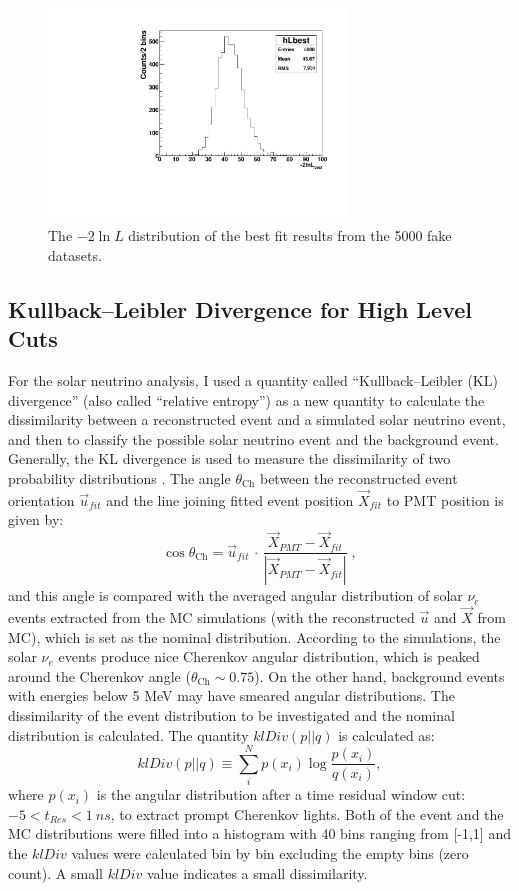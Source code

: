 \begin{figure}[!htb]
	\centering
	\includegraphics[width=8cm]{ensemble_lnLbest.pdf}
	\caption{The $-2\ln L$ distribution of the best fit results from the 5000 fake datasets. \label{poisson_fitLnL}}
\end{figure}

\subsection{Kullback–Leibler Divergence for High Level Cuts}

For the solar neutrino analysis, I used a quantity called ``Kullback–Leibler (KL) divergence'' (also called ``relative entropy'') as a new quantity to calculate the dissimilarity between a reconstructed event and a simulated solar neutrino event, and then to classify the possible solar neutrino event and the background event. Generally, the KL divergence is used to measure the dissimilarity of two probability distributions \cite{murphy2012machine}. The angle $\theta_\mathrm{Ch}$ between the reconstructed event orientation $\vec{u}_{fit}$ and the line joining fitted event position $\vec{X}_{fit}$ to PMT position is given by:
\begin{equation*}
\cos\theta_\mathrm{Ch}=\vec{u}_{fit} \, \cdot \, \frac{\vec{X}_{PMT}-\vec{X}_{fit}}{|\vec{X}_{PMT}-\vec{X}_{fit}|} \; ,
\end{equation*}
and this angle is compared with the averaged angular distribution of solar $\nu_e$ events extracted from the MC simulations (with the reconstructed $\vec{u}$ and $\vec{X}$ from MC), which is set as the nominal distribution. According to the simulations, the solar $\nu_e$ events produce nice Cherenkov angular distribution, which is peaked around the Cherenkov angle ($\theta_\mathrm{Ch}\sim 0.75$). On the other hand, background events with energies below 5 MeV may have smeared angular distributions. The dissimilarity of the event distribution to be investigated and the nominal distribution is calculated. The quantity $klDiv(p||q)$ is calculated as: 
\begin{equation}\label{eq:kldiv}
klDiv(p||q) \equiv \sum_{i}^N p(x_i)\log{\frac{p(x_i)}{q(x_i)}},
\end{equation}
where $p(x_i)$ is the angular distribution after a time residual window cut: $-5<t_{Res}<1~ns$, to extract prompt Cherenkov lights. Both of the event and the MC distributions were filled into a histogram with 40 bins ranging from [-1,1] and the $klDiv$ values were calculated bin by bin excluding the empty bins (zero count). A small $klDiv$ value indicates a small dissimilarity.

